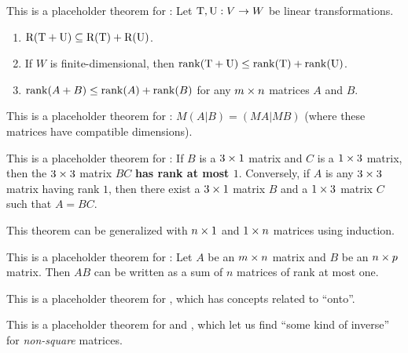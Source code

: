\begin{additional theorem} \label{athm 3.7}
This is a placeholder theorem for :
Let \(\mathrm{T}, \mathrm{U}: V \to W\) be linear transformations.
\begin{enumerate}
\item \(\mathrm{R}(\mathrm{T} + \mathrm{U}) \subseteq \mathrm{R(T)} + \mathrm{R}(\mathrm{U})\).
\item If \(W\) is finite-dimensional, then \(\mathrm{rank}(\mathrm{T} + \mathrm{U}) \le \mathrm{rank}(\mathrm{T}) + \mathrm{rank}(\mathrm{U})\).
\item \(\mathrm{rank}(A + B) \le \mathrm{rank}(A) + \mathrm{rank}(B)\) for any \(m \times n\) matrices \(A\) and \(B\).
\end{enumerate}
\end{additional theorem}

\begin{additional theorem} \label{athm 3.8}
\sloppy This is a placeholder theorem for :
\(M(A|B) = (MA|MB)\) (where these matrices have compatible dimensions).
\end{additional theorem}

\begin{additional theorem} \label{athm 3.9}
This is a placeholder theorem for :
If \(B\) is a \(3 \times 1\) matrix and \(C\) is a \(1 \times 3\) matrix, then the \(3 \times 3\) matrix \(BC\) \textbf{has rank at most \(1\)}.
Conversely, if \(A\) is any \(3 \times 3\) matrix having rank \(1\), then there exist a \(3 \times 1\) matrix \(B\) and a \(1 \times 3\) matrix \(C\) such that \(A = BC\).

This theorem can be generalized with \(n \times 1\) and \(1 \times n\) matrices using induction.
\end{additional theorem}

\begin{additional theorem} \label{athm 3.10}
This is a placeholder theorem for :
Let \(A\) be an \(m \times n\) matrix and \(B\) be an \(n \times p\) matrix.
Then \(AB\) can be written as a sum of \(n\) matrices of rank at most one.
\end{additional theorem}

\begin{additional theorem} \label{athm 3.11}
This is a placeholder theorem for , which has concepts related to ``onto''.
\end{additional theorem}

\begin{additional theorem} \label{athm 3.12}
This is a placeholder theorem for  and , which let us find ``some kind of inverse'' for \emph{non-square} matrices.
\end{additional theorem}